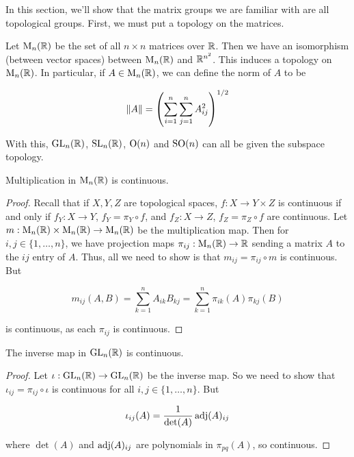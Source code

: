 \documentclass{article}
\begin{document}
    In this section, we'll show that the matrix groups we are familiar with are all topological groups. First, we must put a topology on the matrices.

    \begin{definition}
        [Topology on $\M_n(\R)$]

        Let $\M_n(\R)$ be the set of all $n \times n$ matrices over $\mathbb{R}$. Then we have an isomorphism (between vector spaces) between $\M_n(\R)$ and $\mathbb{R}^{n^2}$. This induces a topology on $\M_n(\R)$. In particular, if $A \in \operatorname{M}_n(\mathbb{R})$, we can define the norm of $A$ to be

        $$\norm{A} = \left(\sum_{i=1}^n\sum_{j=1}^n A_{ij}^2\right)^{1/2}$$
    \end{definition}

    With this, $\operatorname{GL}_n(\mathbb{R})$, $\operatorname{SL}_n(\mathbb{R})$, $\operatorname{O}(n)$ and $\operatorname{SO}(n)$ can all be given the subspace topology.

    \begin{proposition}
        Multiplication in $\M_n(\R)$ is continuous.
    \end{proposition}

    \begin{proof}
        Recall that if $X, Y, Z$ are topological spaces, $f : X \to Y \times Z$ is continuous if and only if $f_Y : X \to Y$, $f_Y = \pi_Y \circ f$, and $f_Z : X \to Z$, $f_Z = \pi_Z \circ f$ are continuous. Let $m : \operatorname{M}_n(\mathbb{R}) \times \operatorname{M}_n(\mathbb{R}) \to \operatorname{M}_n(\mathbb{R})$ be the multiplication map. Then for $i, j \in \{1, \dots, n\}$, we have projection maps $\pi_{ij} : \operatorname{M}_n(\mathbb{R}) \to \mathbb{R}$ sending a matrix $A$ to the $ij$ entry of $A$. Thus, all we need to show is that $m_{ij} = \pi_{ij} \circ m$ is continuous. But

        $$m_{ij}(A, B) = \sum_{k=1}^n A_{ik}B_{kj} = \sum_{k=1}^n \pi_{ik}(A)\pi_{kj}(B)$$

        is continuous, as each $\pi_{ij}$ is continuous.
    \end{proof}

    \begin{proposition}
        The inverse map in $\operatorname{GL}_n(\mathbb{R})$ is continuous.
    \end{proposition}

    \begin{proof}
        Let $\iota : \operatorname{GL}_n(\mathbb{R}) \to \operatorname{GL}_n(\mathbb{R})$ be the inverse map. So we need to show that $\iota_{ij} = \pi_{ij} \circ \iota$ is continuous for all $i, j \in \{1, \dots, n\}$. But

        $$\iota_{ij}(A) = \frac{1}{\det(A)}\operatorname{adj}(A)_{ij}$$

        where $\det(A)$ and $\operatorname{adj}(A)_{ij}$ are polynomials in $\pi_{pq}(A)$, so continuous.
    \end{proof}
\end{document}
